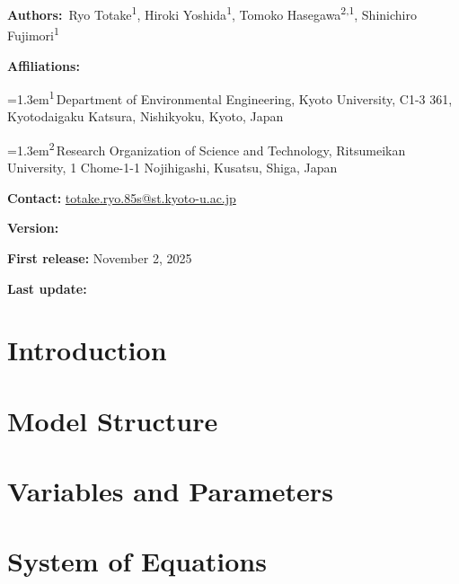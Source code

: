 \documentclass[11pt,a4paper,headings=small,parskip=half]{scrartcl}
\numberwithin{equation}{section}
\newcommand{\affilmark}[1]{\textsuperscript{#1}}
\newcommand{\affil}[2]{%
  \par\hangindent=1.3em\noindent\textsuperscript{#1}\,#2%
}
\begin{document}
{\small
\textbf{Authors:}\ 
Ryo Totake\affilmark{1},
Hiroki Yoshida\affilmark{1},
Tomoko Hasegawa\affilmark{2,1},
Shinichiro Fujimori\affilmark{1}\par

\textbf{Affiliations:}
\affil{1}{Department of Environmental Engineering, Kyoto University, C1-3 361, Kyotodaigaku Katsura, Nishikyoku, Kyoto, Japan}
\affil{2}{Research Organization of Science and Technology, Ritsumeikan University, 1 Chome-1-1 Nojihigashi, Kusatsu, Shiga, Japan}\par
\textbf{Contact:} \href{mailto:totake.ryo.85s@st.kyoto-u.ac.jp}{totake.ryo.85s@st.kyoto-u.ac.jp}\par
\textbf{Version:} \docversion\par 
\textbf{First release:} November 2, 2025\par
\textbf{Last update:} \docdate\par
}

\clearpage

\clearpage
\tableofcontents
\clearpage

\section{Introduction}\label{sec:intro}


\section{Model Structure}\label{sec:structure}


\section{Variables and Parameters}\label{sec:variables}


\section{System of Equations}\label{sec:equations}

\end{document}
